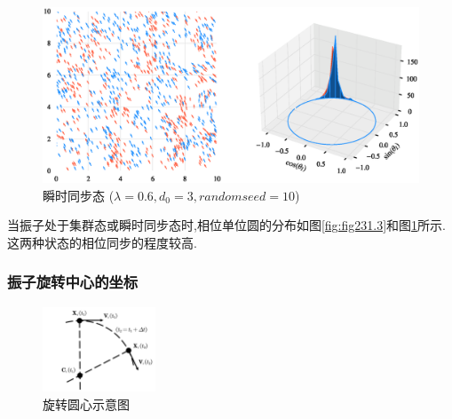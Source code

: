 \documentclass{article}
\begin{document}
\begin{figure}[H]
	\centering
	\includegraphics[width=\textwidth]{./figs/CorrectCoupling_uniform_0.600_3.00.eps}
	\vspace{-1cm}
	\caption{瞬时同步态 ($\lambda=0.6, d_0=3, random seed=10$)}
	\label{fig:fig231.4}
\end{figure}

当振子处于集群态或瞬时同步态时,相位单位圆的分布如图\ref{fig:fig231.3}和图\ref{fig:fig231.4}所示. 这两种状态的相位同步的程度较高.


\subsubsection{振子旋转中心的坐标}

\begin{figure}[H]
	\centering
	\includegraphics[width=0.3\textwidth]{./figs/CenterEps.pdf}
	\vspace{-0.2cm}
	\caption{旋转圆心示意图}
	\label{fig:fig232.1}
\end{figure}
\end{document}
